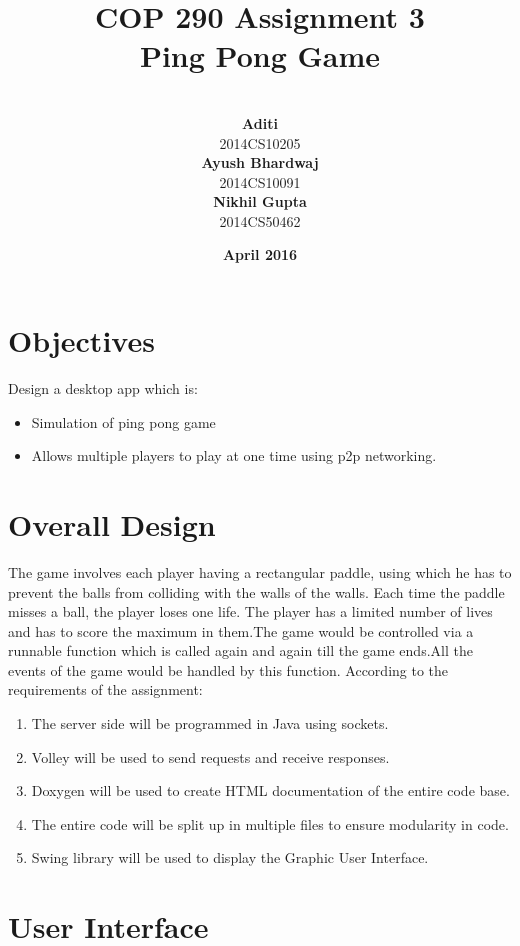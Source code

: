 \documentclass{article}
\title{\vspace*{\fill} \textbf{COP 290 Assignment 3}
	  \\ {\Large \textbf{Ping Pong Game}}
}
\author{
	\vspace{5mm} \\
	 \textbf{Aditi}\\
	2014CS10205 \vspace{2mm} \\
	\textbf{Ayush Bhardwaj}\\ 
	2014CS10091 \vspace{2mm} \\
	\textbf{Nikhil Gupta}\\ 
	2014CS50462 \vspace{2mm}
}
\date{\vspace{3mm} \textbf{April 2016} \vspace*{\fill}}
\begin{document}
	\maketitle

	\newpage

	\tableofcontents

	\newpage

	\section{Objectives}
	Design a desktop app which is:
	\begin{itemize}
	\item Simulation of ping pong game
	\item Allows multiple players to play at one time using p2p networking.
	\end{itemize}

	\section{Overall Design}
		The game involves each player having a rectangular paddle, using which he has to prevent the balls from colliding with the walls of the walls. Each time the paddle misses a ball, the player loses one life. The player has a limited number of lives and has to score the maximum in them.The game would be controlled via a runnable function which is called again and again till the game ends.All the events of the game would be handled by this function. According to the requirements of the assignment:
				\begin{enumerate}
			\item The server side will be programmed in Java using sockets.
			\item Volley will be used to send requests and receive responses.
			\item Doxygen will be used to create HTML documentation of the entire code base.
			\item The entire code will be split up in multiple files to ensure modularity in code.
			\item Swing library will be used to display the Graphic User Interface.
		\end{enumerate}
	\section{User Interface}
	
\end{document}
